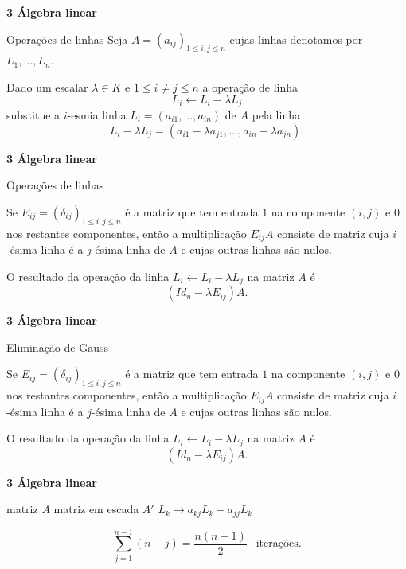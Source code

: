 \documentclass{beamer}
\begin{document}
\begin{frame}{\bf 3  Álgebra linear }
\begin{block}{Operações de linhas}
Seja $A=(a_{ij})_{1\leq i,j\leq n}$ cujas linhas denotamos por $L_1, \ldots, L_n$.\pause 

Dado um escalar $\lambda \in K$ e  $1\leq i \neq j \leq n$ a operação de linha
$$L_i \leftarrow L_i - \lambda L_j$$ substitue a $i$-esmia linha $L_i = (a_{i1}, \ldots, a_{in})$ de $A$ pela linha  $$L_i-\lambda L_j = (a_{i1}-\lambda a_{j1}, \ldots, a_{in}-\lambda a_{jn}).$$\pause
\end{block}
\end{frame}
\begin{frame}{\bf 3  Álgebra linear }
\begin{block}{Operações de linhas}

Se $E_{ij} = ( \delta_{ij} )_{1\leq i,j \leq n}$ é a matriz que tem entrada $1$ na componente $(i,j)$ e $0$ nos restantes componentes, então a multiplicação $E_{ij}A$ consiste de matriz cuja $i$-ésima linha é a $j$-ésima linha de $A$ e cujas outras linhas são nulos.\pause

O resultado da operação da linha $L_i \leftarrow L_i - \lambda L_j$ na matriz $A$ é 
$$ (Id_n - \lambda E_{ij})A.$$
\end{block}
\end{frame}
\begin{frame}{\bf 3  Álgebra linear }
\begin{block}{Eliminação de Gauss}

Se $E_{ij} = ( \delta_{ij} )_{1\leq i,j \leq n}$ é a matriz que tem entrada $1$ na componente $(i,j)$ e $0$ nos restantes componentes, então a multiplicação $E_{ij}A$ consiste de matriz cuja $i$-ésima linha é a $j$-ésima linha de $A$ e cujas outras linhas são nulos.\pause

O resultado da operação da linha $L_i \leftarrow L_i - \lambda L_j$ na matriz $A$ é 
$$ (Id_n - \lambda E_{ij})A.$$
\end{block}
\end{frame}


\begin{frame}[fragile]{\bf 3  Álgebra linear }
\begin{algorithmic}
\REQUIRE matriz $A$
\ENSURE matriz em escada $A'$
			\STATE $L_k \rightarrow a_{kj}L_k-a_{jj}L_k$
		\ENDFOR
	  \ENDIF
	 \ENDFOR
\end{algorithmic}

$$\sum_{j=1}^{n-1} (n-j) = \frac{n(n-1)}{2} \:\:\mbox{ iterações.}$$
\end{frame}
\end{document}
